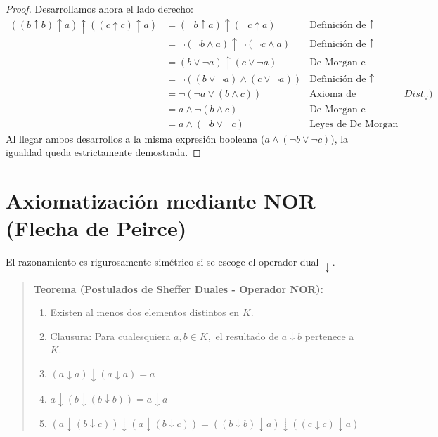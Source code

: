 \begin{proof}
Desarrollamos ahora el lado derecho:
\begin{align*}
((b \uparrow b) \uparrow a) \uparrow ((c \uparrow c) \uparrow a) &= (\neg b \uparrow a) \uparrow (\neg c \uparrow a) & \text{Definición de } \uparrow \\
&= \neg (\neg b \wedge a) \uparrow \neg (\neg c \wedge a) & \text{Definición de } \uparrow \\
&= (b \vee \neg a) \uparrow (c \vee \neg a) & \text{De Morgan e Involución} \\
&= \neg ((b \vee \neg a) \wedge (c \vee \neg a)) & \text{Definición de } \uparrow \\
&= \neg (\neg a \vee (b \wedge c)) & \text{Axioma de Distributividad ($Dist_\vee$)} \\
&= a \wedge \neg (b \wedge c) & \text{De Morgan e Involución} \\
&= a \wedge (\neg b \vee \neg c) & \text{Leyes de De Morgan}
\end{align*}
Al llegar ambos desarrollos a la misma expresión booleana ($a \wedge (\neg b \vee \neg c)$), la igualdad queda estrictamente demostrada.
\end{proof}

\section{Axiomatización mediante NOR (Flecha de Peirce)}

El razonamiento es rigurosamente simétrico si se escoge el operador dual $\downarrow.$

\begin{quote}\textbf{Teorema (Postulados de Sheffer Duales - Operador NOR):}\label{sheffer_nor}
\begin{enumerate}
    \item Existen al menos dos elementos distintos en $K.$
    \item Clausura: Para cualesquiera $a, b \in K,$ el resultado de $a \downarrow b$ pertenece a $K.$
    \item $(a \downarrow a) \downarrow (a \downarrow a) = a$
    \item $a \downarrow (b \downarrow (b \downarrow b)) = a \downarrow a$
    \item $(a \downarrow (b \downarrow c)) \downarrow (a \downarrow (b \downarrow c)) = ((b \downarrow b) \downarrow a) \downarrow ((c \downarrow c) \downarrow a)$
\end{enumerate}
\end{quote}

